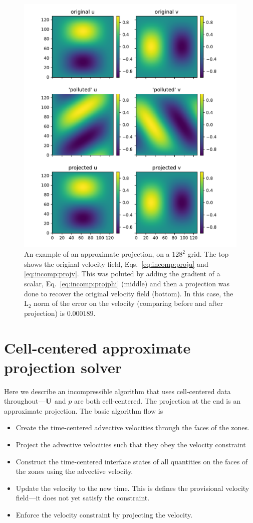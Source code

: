 \begin{figure}[t]
\centering
\includegraphics[width=0.9\linewidth]{project-u}
\caption[Example of a projection]{\label{fig:incomp:project} An
  example of an approximate projection, on a $128^2$ grid.  The top
  shows the original velocity field, Eqs.~\ref{eq:incomp:proju} and
  \ref{eq:incomp:projv}.  This was poluted by adding the gradient of a
  scalar, Eq.~\ref{eq:incomp:projphi} (middle) and then a projection
  was done to recover the original velocity field (bottom).  In this
  case, the L$_2$ norm of the error on the velocity (comparing before
  and after projection) is $0.000189$.}
\end{figure}

\section{Cell-centered approximate projection solver}

Here we describe an incompressible algorithm that uses cell-centered
data throughout---${\bf U}$ and $p$ are both cell-centered.  The
projection at the end is an approximate projection.  The basic
algorithm flow is 
\begin{itemize}
\item Create the time-centered advective velocities through the faces
  of the zones.
\item Project the advective velocities such that they obey the
  velocity constraint
\item Construct the time-centered interface states of all quantities
  on the faces of the zones using the advective velocity.
\item Update the velocity to the new time.  This is defines the
  provisional velocity field---it does not yet satisfy the constraint.
\item Enforce the velocity constraint by projecting the velocity.
\end{itemize}

